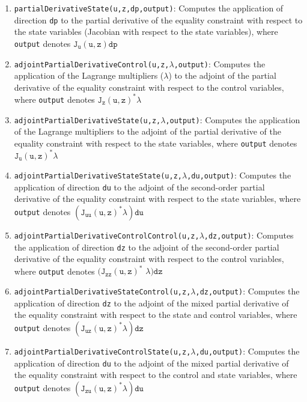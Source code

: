 \begin{enumerate}
    \item \texttt{partialDerivativeState(u,z,dp,output)}: Computes the application of direction \texttt{dp} to the partial derivative of the equality constraint with respect to the state variables (Jacobian with respect to the state variables), where \texttt{output} denotes $\mathtt{J_u(u,z)dp}$
    \item \texttt{adjointPartialDerivativeControl(u,z,$\mathtt{\lambda}$,output)}: Computes the application of the Lagrange multipliers ($\mathtt{\lambda}$) to the adjoint of the partial derivative of the equality constraint with respect to the control variables, where \texttt{output} denotes $\mathtt{J_z(u,z)^{\ast}\lambda}$
    \item \texttt{adjointPartialDerivativeState(u,z,$\mathtt{\lambda}$,output)}: Computes the application of the Lagrange multipliers to the adjoint of the partial derivative of the equality constraint with respect to the state variables, where \texttt{output} denotes $\mathtt{J_u(u,z)^{\ast}\lambda}$
    \item \texttt{adjointPartialDerivativeStateState(u,z,$\mathtt{\lambda}$,du,output)}: Computes the application of direction \texttt{du} to the adjoint of the second-order partial derivative of the equality constraint with respect to the state variables, where \texttt{output} denotes $\mathtt{(J_{uu}(u,z)^{\ast}\lambda)du}$
    \item \texttt{adjointPartialDerivativeControlControl(u,z,$\mathtt{\lambda}$,dz,output)}: Computes the application of direction \texttt{dz} to the adjoint of the second-order partial derivative of the equality constraint with respect to the control variables, where \texttt{output} denotes $\mathtt{(J_{zz}(u,z)^{\ast}}$ $\mathtt{\lambda)dz}$
    \item \texttt{adjointPartialDerivativeStateControl(u,z,$\mathtt{\lambda}$,dz,output)}: Computes the application of direction \texttt{dz} to the adjoint of the mixed partial derivative of the equality constraint with respect to the state and control variables, where \texttt{output} denotes $\mathtt{(J_{uz}(u,z)^{\ast}\lambda)dz}$
    \item \texttt{adjointPartialDerivativeControlState(u,z,$\mathtt{\lambda}$,du,output)}: Computes the application of direction \texttt{du} to the adjoint of the mixed partial derivative of the equality constraint with respect to the control and state variables, where \texttt{output} denotes $\mathtt{(J_{zu}(u,z)^{\ast}\lambda)du}$
    \end{enumerate}
    
